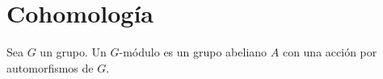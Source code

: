 %
%
%
%
%
%
%
\section*{Cohomología}

\begin{definition}
	Sea $G$ un grupo. Un $G$-módulo es un grupo abeliano $A$ con una acción por
	automorfismos de $G$. 
\end{definition}

